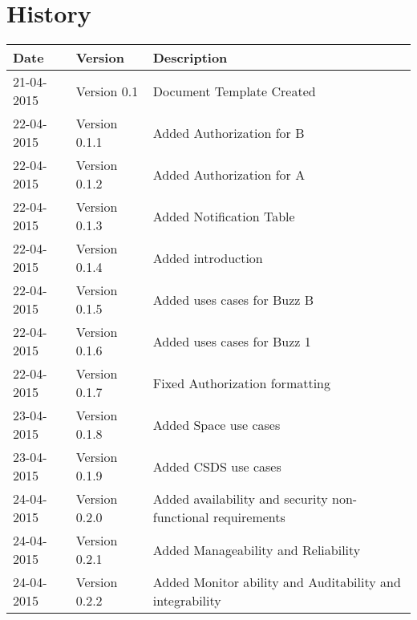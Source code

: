 \documentclass[12pt]{article}
\begin{document}


\section{History}
\begin{tabular}{|p{3cm}|p{5cm}|p{6cm}|}

\hline
Date & Version & Description\\ %
\hline
21-04-2015 & Version 0.1 & Document Template Created\\ %
\hline
22-04-2015 & Version 0.1.1 & Added Authorization for B\\ %
\hline
22-04-2015 & Version 0.1.2 & Added Authorization for A\\ %
\hline
22-04-2015 & Version 0.1.3 & Added Notification Table\\ %
\hline
22-04-2015 & Version 0.1.4 & Added introduction\\ %
\hline
22-04-2015 & Version 0.1.5 & Added uses cases for Buzz B\\ %
\hline
22-04-2015 & Version 0.1.6 & Added uses cases for Buzz 1\\ %
\hline
22-04-2015 & Version 0.1.7 & Fixed Authorization formatting\\ %
\hline
23-04-2015 & Version 0.1.8 & Added Space use cases\\ %
\hline
23-04-2015 & Version 0.1.9 & Added CSDS use cases\\ %
\hline
24-04-2015 & Version 0.2.0 & Added availability and security non-functional requirements\\ %
\hline
24-04-2015 & Version 0.2.1 & Added Manageability and Reliability\\ %
\hline
24-04-2015 & Version 0.2.2 & Added Monitor ability and Auditability and integrability\\ %
\hline
\end{tabular}
\end{document}
